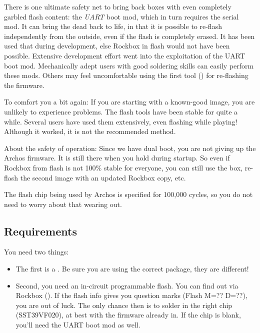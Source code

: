 
There is one ultimate safety net to bring back boxes with even completely 
garbled flash content: the \emph{UART} boot mod, which in turn requires the 
serial mod. It can bring the dead back to life, in that it is possible to 
re-flash independently from the outside, even if the flash is completely erased.
It has been used that during development, else Rockbox in flash would not have 
been possible. Extensive development effort went into the exploitation of the 
UART boot mod. Mechanically adept users with good soldering skills can easily 
perform these mods. Others may feel uncomfortable using the first tool 
() for re-flashing the firmware.


To comfort you a bit again: If you are starting with a known-good image, you 
are unlikely to experience problems. The flash tools have been stable for quite
a while. Several users have used them extensively, even flashing while playing!
Although it worked, it is not the recommended method.

About the safety of operation: Since we have dual boot, you are not giving up 
the Archos firmware. It is still there when you hold
 during startup. So even if Rockbox from flash is not 100\% stable for
everyone, you can still use the box, re-flash the second image with an updated 
Rockbox copy, etc.

The flash chip being used by Archos is specified for 100,000 cycles, so you do not need to worry about that wearing out.

\subsection{Requirements}
You need two things:
\begin{itemize}
\item The first is a \playername. Be sure you are using the correct package, 
  they are different!
\item Second, you need an in-circuit programmable flash.  You can find out via Rockbox (). If the flash info gives you question marks (Flash M=?? D=??), 
  you are out of luck. The only chance then is to solder in the right chip 
  (SST39VF020), at best with the firmware already in. If the chip is blank, 
  you'll need the UART boot mod as well.
\end{itemize}

